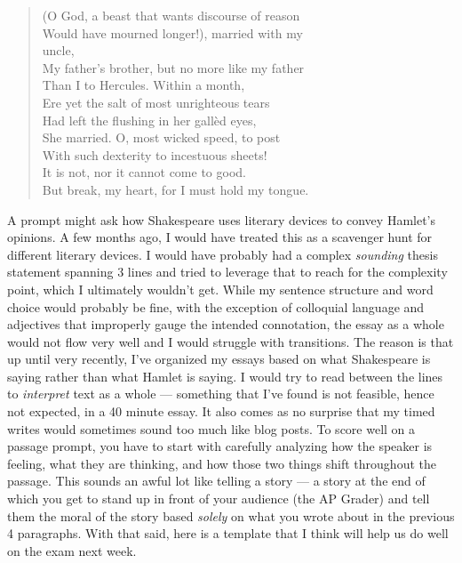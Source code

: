 \documentclass[11pt]{article}
\begin{document}
\begin{quote}
{(O God, a beast that wants discourse of reason\\
Would have mourned longer!), married with my\\
uncle,\\
My father’s brother, but no more like my father\\
Than I to Hercules. Within a month,\\
Ere yet the salt of most unrighteous tears\\
Had left the flushing in her gallèd eyes,\\
She married. O, most wicked speed, to post\\
With such dexterity to incestuous sheets!\\
It is not, nor it cannot come to good.\\
	But break, my heart, for I must hold my tongue.\\}
\end{quote}

A prompt might ask how Shakespeare uses literary devices to convey Hamlet's opinions.
A few months ago, I would have treated this as a scavenger hunt for different literary devices.
I would have probably had a complex \textit{sounding} thesis statement spanning 3 lines and tried to leverage that to reach for the complexity point, which I ultimately wouldn't get.
While my sentence structure and word choice would probably be fine, with the exception of colloquial language and adjectives that improperly gauge the intended connotation, the essay as a whole would not flow very well and I would struggle with transitions.
The reason is that up until very recently, I've organized my essays based on what Shakespeare is saying rather than what Hamlet is saying.
I would try to read between the lines to \textit{interpret} text as a whole --- something that I've found is not feasible, hence not expected, in a 40 minute essay.
It also comes as no surprise that my timed writes would sometimes sound too much like blog posts.
To score well on a passage prompt, you have to start with carefully analyzing how the speaker is feeling, what they are thinking, and how those two things shift throughout the passage.
This sounds an awful lot like telling a story ---
a story at the end of which you get to stand up in front of your audience (the AP Grader) and tell them the moral of the story based \textit{solely} on what you wrote about in the previous 4 paragraphs.
With that said, here is a template that I think will help us do well on the exam next week.\\
\end{document}
